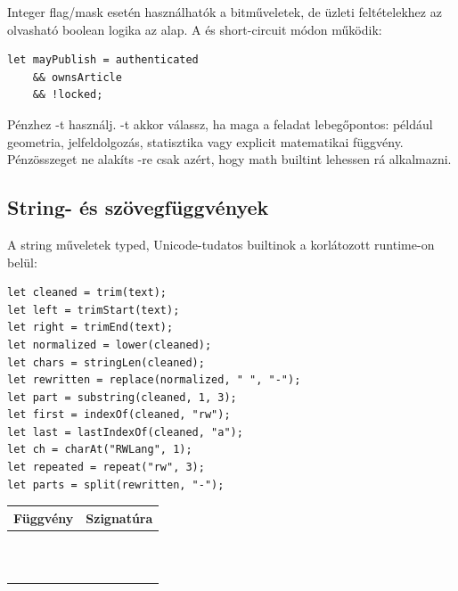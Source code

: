 Integer flag/mask esetén használhatók a bitműveletek, de üzleti feltételekhez az olvasható boolean logika az alap. A \code{&&} és \code{||} short-circuit módon működik:

\begin{lstlisting}[language=RWLang]
let mayPublish = authenticated
    && ownsArticle
    && !locked;
\end{lstlisting}

Pénzhez -t használj. -t akkor válassz, ha maga a feladat lebegőpontos: például geometria, jelfeldolgozás, statisztika vagy explicit matematikai függvény. Pénzösszeget ne alakíts -re csak azért, hogy math builtint lehessen rá alkalmazni.

\subsection*{String- és szövegfüggvények}

A string műveletek typed, Unicode-tudatos builtinok a korlátozott runtime-on belül:

\begin{lstlisting}[language=RWLang]
let cleaned = trim(text);
let left = trimStart(text);
let right = trimEnd(text);
let normalized = lower(cleaned);
let chars = stringLen(cleaned);
let rewritten = replace(normalized, " ", "-");
let part = substring(cleaned, 1, 3);
let first = indexOf(cleaned, "rw");
let last = lastIndexOf(cleaned, "a");
let ch = charAt("RWLang", 1);
let repeated = repeat("rw", 3);
let parts = split(rewritten, "-");
\end{lstlisting}

\begin{center}
\begin{tabularx}{\textwidth}{@{}Y Y@{}}
\toprule
\textbf{Függvény} & \textbf{Szignatúra} \\
\midrule
{} &  \\
 &  \\
 &  \\
 &  \\
 &  \\
 &  \\
 &  \\
 &  \\
 &  \\
 &  \\
 &  \\
\bottomrule
\end{tabularx}
\end{center}

